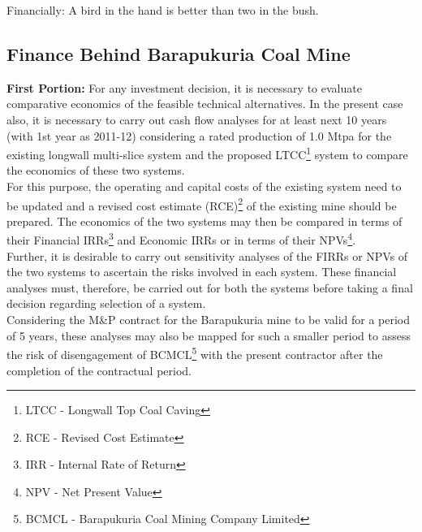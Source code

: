 \documentclass[11 pt]{article}
\begin{document}
\begin{center}
\begin{tcolorbox}[frogbox, arc=3 mm, width= 356 pt]
	Financially: A bird in the hand is better than two in the bush.
\end{tcolorbox}
\end{center}

\subsection{Finance Behind Barapukuria Coal Mine}
\hspace{5 mm} \textbf{First Portion:} For any investment decision, it is necessary to evaluate comparative economics of the feasible technical alternatives. In the present case also, it is necessary to carry out cash flow analyses for at least next 10 years (with 1st year as 2011-12) considering a rated production of 1.0 Mtpa for the existing longwall multi-slice system and the proposed LTCC\footnote{LTCC - Longwall Top Coal Caving} system to compare the economics of these two systems.\\
For this purpose, the operating and capital costs of the existing system need to be updated and a revised cost estimate (RCE)\footnote{RCE - Revised Cost Estimate} of the existing mine should be prepared. The economics of the two systems may then be compared in terms of their Financial IRRs\footnote{IRR - Internal Rate of Return} and Economic IRRs or in terms of their NPVs\footnote{NPV - Net Present Value}.\\
Further, it is desirable to carry out sensitivity analyses of the FIRRs or NPVs of the two systems to ascertain the risks involved in each system. These financial analyses must, therefore, be carried out for both the systems before taking a final decision regarding selection of a system.\\
Considering the M\&P contract for the Barapukuria mine to be valid for a period of 5 years, these analyses may also be mapped for such a smaller period to assess the risk of disengagement of BCMCL\footnote{BCMCL - Barapukuria Coal Mining Company Limited} with the present contractor after the completion of the contractual period.\\
\end{document}
